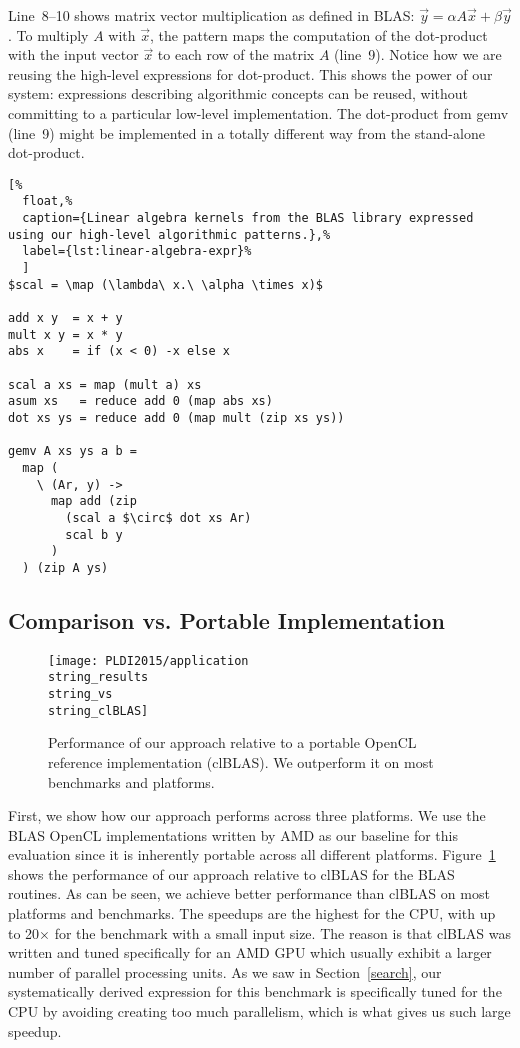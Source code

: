 Line~8--10 shows matrix vector multiplication as defined in BLAS: $\vec{y} = \alpha A \vec{x} + \beta \vec{y}$.
To multiply $A$ with $\vec{x}$, the  pattern maps the computation of the dot-product with the input vector $\vec{x}$ to each row of the matrix $A$ (line~9).
Notice how we are reusing the high-level expressions for dot-product. %
This shows the power of our system: expressions describing algorithmic concepts can be reused, without committing to a particular low-level implementation.
The dot-product from gemv (line~9) might be implemented in a totally different way from the stand-alone dot-product.

\begin{lstlisting}[%
  float,%
  caption={Linear algebra kernels from the BLAS library expressed using our high-level algorithmic patterns.},%
  label={lst:linear-algebra-expr}%
  ]
$scal = \map (\lambda\ x.\ \alpha \times x)$

add x y  = x + y
mult x y = x * y
abs x    = if (x < 0) -x else x

scal a xs = map (mult a) xs
asum xs   = reduce add 0 (map abs xs)
dot xs ys = reduce add 0 (map mult (zip xs ys))

gemv A xs ys a b =
  map (
    \ (Ar, y) ->
      map add (zip
        (scal a $\circ$ dot xs Ar)
        scal b y
      )
  ) (zip A ys)
\end{lstlisting}


\subsection{Comparison vs. Portable Implementation}

\begin{figure}[t]
  \texttt{[image: PLDI2015/application\\string\_results\\string\_vs\\string\_clBLAS]}
  \caption{Performance of our approach relative to a portable OpenCL reference implementation (clBLAS).
           We outperform it on most benchmarks and platforms.}
  \label{fig:clblas}
\end{figure}

First, we show how our approach performs across three platforms.
We use the BLAS OpenCL implementations written by AMD as our baseline for this evaluation since it is inherently portable across all different platforms.
Figure~\ref{fig:clblas} shows the performance of our approach relative to clBLAS for the BLAS routines.
As can be seen, we achieve better performance than clBLAS on most platforms and benchmarks.
The speedups are the highest for the CPU, with up to 20$\times$ for the  benchmark with a small input size.
The reason is that clBLAS was written and tuned specifically for an AMD GPU which usually exhibit a larger number of parallel processing units.
As we saw in Section~\ref{search}, our systematically derived expression for this benchmark is specifically tuned for the CPU by avoiding creating too much parallelism, which is what gives us such large speedup.

